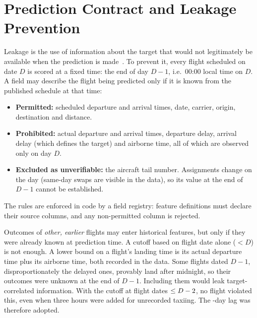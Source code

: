 \documentclass[conference]{IEEEtran}
\begin{document}
\section{Prediction Contract and Leakage Prevention}\label{sec:contract}
Leakage is the use of information about the target that would not legitimately be available when
the prediction is made~\cite{kaufman2012}. To prevent it, every flight scheduled on date $D$ is
scored at a fixed time: the end of day $D-1$, i.e.\ 00:00 local time on $D$. A field may describe
the flight being predicted only if it is known from the published schedule at that time:
\begin{itemize}
\item \textbf{Permitted:} scheduled departure and arrival times, date, carrier, origin,
destination and distance.
\item \textbf{Prohibited:} actual departure and arrival times, departure delay, arrival delay
(which defines the target) and airborne time, all of which are observed only on day $D$.
\item \textbf{Excluded as unverifiable:} the aircraft tail number. Assignments change on the day
(same-day swaps are visible in the data), so its value at the end of $D-1$ cannot be established.
\end{itemize}
The rules are enforced in code by a field registry: feature definitions must declare their source
columns, and any non-permitted column is rejected.

Outcomes of \emph{other, earlier} flights may enter historical features, but only if they were
already known at prediction time. A cutoff based on flight date alone ($< D$) is not enough. A
lower bound on a flight's landing time is its actual departure time plus its airborne time, both
recorded in the data. Some flights dated $D-1$, disproportionately the delayed ones, provably land
after midnight, so their outcomes were unknown at the end of $D-1$. Including them would leak
target-correlated information. With the cutoff at flight dates $\leq D-2$, no flight violated
this, even when three hours were added for unrecorded taxiing. The \HistLag-day lag was therefore
adopted.

\end{document}
